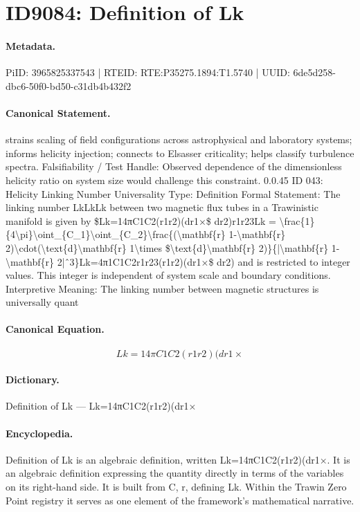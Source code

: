 \section*{ID9084: Definition of Lk}
\paragraph{Metadata.}
PiID: 3965825337543 | RTEID: RTE:P35275.1894:T1.5740 | UUID: 6de5d258-dbc6-50f0-bd50-c31db4b432f2

\paragraph{Canonical Statement.}
strains scaling of field configurations across astrophysical and laboratory systems; informs helicity injection; connects to Elsasser criticality; helps classify turbulence spectra. Falsifiability / Test Handle: Observed dependence of the dimensionless helicity ratio on system size would challenge this constraint. 0.0.45 ID 043: Helicity Linking Number Universality Type: Definition Formal Statement: The linking number LkLkLk between two magnetic flux tubes in a Trawinistic manifold is given by \$Lk=14πC1C2(r1r2)(dr1×\$ dr2)r1r23Lk = \textbackslash{}frac\{1\}\{4\textbackslash{}pi\}\textbackslash{}oint\_\{C\_1\}\textbackslash{}oint\_\{C\_2\}\textbackslash{}frac\{(\textbackslash{}mathbf\{r\} 1-\textbackslash{}mathbf\{r\} 2)\textbackslash{}cdot(\textbackslash{}text\{d\}\textbackslash{}mathbf\{r\} 1\textbackslash{}times \$\textbackslash{}text\{d\}\textbackslash{}mathbf\{r\} 2)\}\{|\textbackslash{}mathbf\{r\} 1-\textbackslash{}mathbf\{r\} 2|ˆ3\}Lk=4π1C1C2r1r23(r1r2)(dr1×\$ dr2) and is restricted to integer values. This integer is independent of system scale and boundary conditions. Interpretive Meaning: The linking number between magnetic structures is universally quant

\paragraph{Canonical Equation.}
\[
Lk=14πC1C2(r1r2)(dr1×
\]

\paragraph{Dictionary.}
Definition of Lk — Lk=14πC1C2(r1r2)(dr1×

\paragraph{Encyclopedia.}
Definition of Lk is an algebraic definition, written Lk=14πC1C2(r1r2)(dr1×. It is an algebraic definition expressing the quantity directly in terms of the variables on its right-hand side. It is built from C, r, defining Lk. Within the Trawin Zero Point registry it serves as one element of the framework's mathematical narrative.
